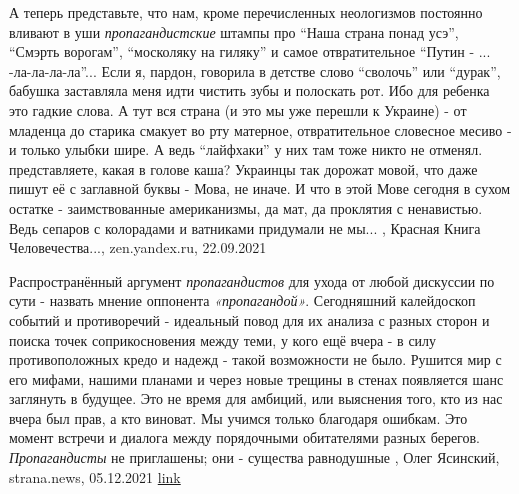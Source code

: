 А теперь представьте, что нам, кроме перечисленных неологизмов постоянно
вливают в уши \emph{пропагандистские} штампы про \enquote{Наша страна понад усэ}, \enquote{Смэрть
ворогам}, \enquote{москоляку на гиляку} и самое отвратительное \enquote{Путин - ...
-ла-ла-ла-ла}... Если я, пардон, говорила в детстве слово \enquote{сволочь} или
\enquote{дурак}, бабушка заставляла меня идти чистить зубы и полоскать рот. Ибо для
ребенка это гадкие слова. А тут вся страна (и это мы уже перешли к Украине) -
от младенца до старика смакует во рту матерное, отвратительное словесное месиво
- и только улыбки шире. А ведь \enquote{лайфхаки} у них там тоже никто не отменял.
представляете, какая в голове каша? Украинцы так дорожат мовой, что даже пишут
её с заглавной буквы - Мова, не иначе. И что в этой Мове сегодня в сухом
остатке - заимствованные американизмы, да мат, да проклятия с ненавистью. Ведь
сепаров с колорадами и ватниками придумали не мы...
, 
Красная Книга Человечества..., zen.yandex.ru, 22.09.2021

Распространённый аргумент \emph{пропагандистов} для ухода от любой дискуссии по сути -
назвать мнение оппонента \emph{«пропагандой»}. Сегодняшний калейдоскоп событий и
противоречий - идеальный повод для их анализа с разных сторон и поиска точек
соприкосновения между теми, у кого ещё вчера - в силу противоположных кредо и
надежд - такой возможности не было. Рушится мир с его мифами, нашими планами и
через новые трещины в стенах появляется шанс заглянуть в будущее. Это не время
для амбиций, или выяснения того, кто из нас вчера был прав, а кто виноват. Мы
учимся только благодаря ошибкам.  Это момент встречи и диалога между
порядочными обитателями разных берегов.  \emph{Пропагандисты} не приглашены; они -
существа равнодушные
, 
Олег Ясинский, strana.news, 05.12.2021
\href{https://strana.news/opinions/365575-staryj-mir-rushitsja-vmeste-s-eho-mifami-i-nashimi-planami.html}{link}
